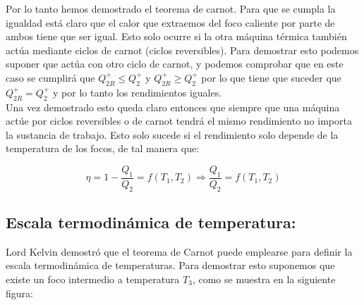 \documentclass[12pt,a4paper]{article}
\begin{document}
Por lo tanto hemos demostrado el teorema de carnot. Para que se cumpla la igualdad está claro que el calor que extraemos del foco caliente por parte de ambos tiene que ser igual. Esto solo ocurre si la otra máquina térmica también actúa mediante ciclos de carnot (ciclos reversibles). Para demostrar esto podemos suponer que actúa con otro ciclo de carnot, y podemos comprobar que en este caso se cumplirá que $Q_{2R}^+ \leq Q_2^+$ y $Q_{2R}^+ \geq Q_2^+$ por lo que tiene que suceder que $Q_{2R}^+ = Q_2^+$ y por lo tanto los rendimientos iguales. \\

Una vez demostrado esto queda claro entonces que siempre que una máquina actúe por ciclos reversibles o de carnot tendrá el mismo rendimiento no importa la sustancia de trabajo. Esto solo sucede si el rendimiento solo depende de la temperatura de los focos, de tal manera que:

\begin{equation}
\eta = 1 - \dfrac{Q_1}{Q_2} = f(T_1,T_2) \Longrightarrow \dfrac{Q_1}{Q_2} = f(T_1,T_2)
\end{equation}



\subsection{Escala termodinámica de temperatura:}

Lord Kelvin demostró que el teorema de Carnot puede emplearse para definir la escala termodinámica de temperaturas. Para demostrar esto suponemos que existe un foco intermedio a temperatura $T_3$, como se muestra en la siguiente figura:
\end{document}
